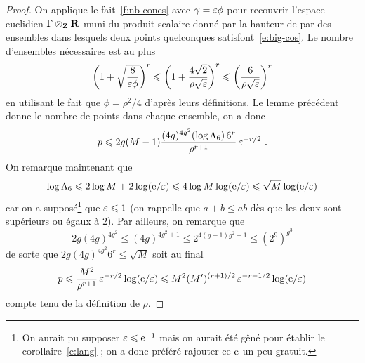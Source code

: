 \begin{proof}
  On applique le fait~\vref{f:nb-cones} avec \( \gamma = \varepsilon\phi \) pour
  recouvrir l'espace euclidien \( \Gamma \otimes_{\mathbf{Z}} {\mathbf{R}} \) muni du produit
  scalaire donné par la hauteur de \NT par des ensembles dans lesquels deux
  points quelconques satisfont~\eqref{e:big-cos}. Le nombre d'ensembles
  nécessaires est au plus
  \begin{equation}
    \left( 1 + \sqrt{ \frac{ 8 }{ \varepsilon\phi } } \right)^r
    \leqslant
    \left( 1 + \frac{ 4\sqrt 2 }{ \rho \sqrt{\varepsilon} } \right)^r
    \leqslant
    \left( \frac{ 6 }{ \rho \sqrt{\varepsilon} } \right)^r
  \end{equation}
  en utilisant le fait que \( \phi = \rho^2 / 4 \) d'après leurs définitions.
  Le lemme précédent donne le nombre de points dans chaque ensemble, on a donc
  \begin{equation}
    p
    \leqslant
    2 g (M-1) \frac{ (4g)^{4g^2} (\log \Lambda_6) \, 6^r }{ \rho^{r+1} }
    \, \varepsilon^{-r/2}
    \text{ .}
  \end{equation}
  On remarque maintenant que
  \begin{equation}
    \log \Lambda_6
    \leqslant
    2 \log M + 2 \log(\mathrm e/\varepsilon)
    \leqslant
    4 \log M \log(\mathrm e/\varepsilon)
    \leqslant
    \sqrt M \log(\mathrm e/\varepsilon)
  \end{equation}
  car on a supposé\footnote{On aurait pu supposer \( \varepsilon \leqslant \mathrm e^{-1} \)
    mais on aurait été gêné pour établir le corollaire~\vref{c:lang} ; on a
    donc préféré rajouter ce \( \mathrm e \) un peu gratuit.} que \( \varepsilon \leqslant 1 \)
  (on rappelle que \( a + b \le ab \) dès que les deux sont supérieurs ou
  égaux à \( 2 \)).  Par ailleurs, on remarque que
  \begin{equation}
    2 g (4g)^{4g^2}
    \le
    (4g)^{4g^2+1}
    \le
    2^{4(g+1)g^2 + 1}
    \le
    (2^9)^{g^3}
  \end{equation}
  de sorte que \( 2 g (4g)^{4g^2} 6^r \le \sqrt M \) soit au final
  \begin{equation}
    p
    \leqslant
    \frac{ M^2 }{ \rho^{r+1} }
    \, \varepsilon^{-r/2} \log(\mathrm e/\varepsilon)
    \leqslant
    M^2 (M')^{(r+1)/2}
    \, \varepsilon^{-r - 1/2} \log(\mathrm e/\varepsilon)
  \end{equation}
  compte tenu de la définition de \( \rho \).
\end{proof}

